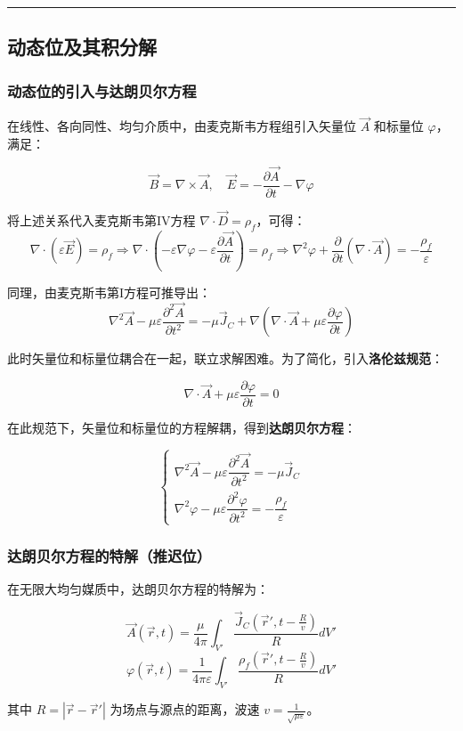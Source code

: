 \vspace{0.8cm}\hrule\vspace{0.8cm}

\subsection{动态位及其积分解}
\subsubsection{动态位的引入与达朗贝尔方程}
在线性、各向同性、均匀介质中，由麦克斯韦方程组引入矢量位 $\vec{A}$ 和标量位 $\varphi$，满足：
\begin{formulaBox}
\[
\vec{B} = \nabla \times \vec{A}, \quad \vec{E} = -\frac{\partial \vec{A}}{\partial t} - \nabla \varphi
\]
\end{formulaBox}

将上述关系代入麦克斯韦第IV方程 $\nabla \cdot \vec{D} = \rho_f$，可得：
\[
\nabla \cdot (\varepsilon \vec{E}) = \rho_f
\Rightarrow \nabla \cdot \left( -\varepsilon \nabla \varphi - \varepsilon \frac{\partial \vec{A}}{\partial t} \right) = \rho_f
\Rightarrow \nabla^2 \varphi + \frac{\partial}{\partial t} (\nabla \cdot \vec{A}) = -\frac{\rho_f}{\varepsilon}
\]

同理，由麦克斯韦第I方程可推导出：
\[
\nabla^2 \vec{A} - \mu\varepsilon \frac{\partial^2 \vec{A}}{\partial t^2} = -\mu \vec{J}_C + \nabla \left( \nabla \cdot \vec{A} + \mu\varepsilon \frac{\partial \varphi}{\partial t} \right)
\]

此时矢量位和标量位耦合在一起，联立求解困难。为了简化，引入\textbf{洛伦兹规范}：
\begin{formulaBox}
\[
\nabla \cdot \vec{A} + \mu\varepsilon \frac{\partial \varphi}{\partial t} = 0
\]
\end{formulaBox}

在此规范下，矢量位和标量位的方程解耦，得到\textbf{达朗贝尔方程}：
\begin{formulaBox}
\[
\begin{cases}
\nabla^2 \vec{A} - \mu\varepsilon \dfrac{\partial^2 \vec{A}}{\partial t^2} = -\mu \vec{J}_C \\[6pt]
\nabla^2 \varphi - \mu\varepsilon \dfrac{\partial^2 \varphi}{\partial t^2} = -\dfrac{\rho_f}{\varepsilon}
\end{cases}
\]
\end{formulaBox}

\subsubsection{达朗贝尔方程的特解（推迟位）}
在无限大均匀媒质中，达朗贝尔方程的特解为：
\begin{formulaBox}
\[
\vec{A}(\vec{r}, t) = \frac{\mu}{4\pi} \int_{V'} \frac{\vec{J}_C(\vec{r}', t - \frac{R}{v})}{R} dV'
\]
\[
\varphi(\vec{r}, t) = \frac{1}{4\pi\varepsilon} \int_{V'} \frac{\rho_f(\vec{r}', t - \frac{R}{v})}{R} dV'
\]
\end{formulaBox}
其中 $R = |\vec{r} - \vec{r}'|$ 为场点与源点的距离，波速 $v = \frac{1}{\sqrt{\mu\varepsilon}}$。

